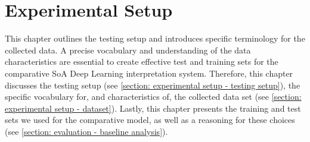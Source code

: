 \chapter{Experimental Setup}
\label{chapter: experimental setup}



This chapter outlines the testing setup and introduces specific terminology for the collected data.
A precise vocabulary and understanding of the data characteristics are essential to create effective test and training sets for the comparative SoA Deep Learning interpretation system.
Therefore, this chapter discusses the testing setup (see \cref{section: experimental setup - testing setup}), the specific vocabulary for, and characteristics of, the collected data set (see \cref{section: experimental setup - dataset}).
Lastly, this chapter presents the training and test sets we used for the comparative model, as well as a reasoning for these choices (see \cref{section: evaluation - baseline analysis}).

% 
% 






